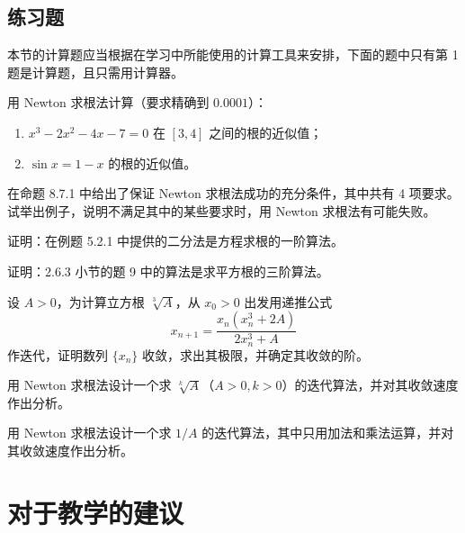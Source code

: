 \subsection{练习题}

本节的计算题应当根据在学习中所能使用的计算工具来安排，下面的题中只有第 1 题是计算题，且只需用计算器。

\begin{xexercise}[1]
用 Newton 求根法计算（要求精确到 $0.0001$）：
  \begin{enumerate}[label=(\arabic*)]
    \item $x^3-2x^2-4x-7=0$ 在 $[3,4]$ 之间的根的近似值；
    \item $\sin x=1-x$ 的根的近似值。
  \end{enumerate}
\end{xexercise}

\begin{xexercise}[2]
在命题 8.7.1 中给出了保证 Newton 求根法成功的充分条件，其中共有 4 项要求。试举出例子，说明不满足其中的某些要求时，用 Newton 求根法有可能失败。
\end{xexercise}

\begin{xexercise}[3]
证明：在例题 5.2.1 中提供的二分法是方程求根的一阶算法。
\end{xexercise}

\begin{xexercise}[4]
证明：2.6.3 小节的题 9 中的算法是求平方根的三阶算法。
\end{xexercise}

\begin{xexercise}[5]
设 $A>0$，为计算立方根 $\sqrt[3]A$，从 $x_0>0$ 出发用递推公式
  \[
    x_{n+1}=\frac{x_n(x_n^3+2A)}{2x_n^3+A}
  \]
  作迭代，证明数列 $\{x_n\}$ 收敛，求出其极限，并确定其收敛的阶。
\end{xexercise}

\begin{xexercise}[6]
用 Newton 求根法设计一个求 $\sqrt[k]A$（$A>0,k>0$）的迭代算法，并对其收敛速度作出分析。
\end{xexercise}

\begin{xexercise}[7]
用 Newton 求根法设计一个求 $1/A$ 的迭代算法，其中只用加法和乘法运算，并对其收敛速度作出分析。
\end{xexercise}

\section{对于教学的建议}

